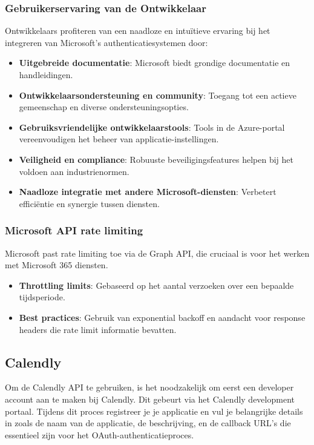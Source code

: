 \subsubsection{Gebruikerservaring van de Ontwikkelaar}
Ontwikkelaars profiteren van een naadloze en intuïtieve ervaring bij het integreren van Microsoft's authenticatiesystemen door:
\begin{itemize}
    \item \textbf{Uitgebreide documentatie}: Microsoft biedt grondige documentatie en handleidingen.
    \item \textbf{Ontwikkelaarsondersteuning en community}: Toegang tot een actieve gemeenschap en diverse ondersteuningsopties.
    \item \textbf{Gebruiksvriendelijke ontwikkelaarstools}: Tools in de Azure-portal vereenvoudigen het beheer van applicatie-instellingen.
    \item \textbf{Veiligheid en compliance}: Robuuste beveiligingsfeatures helpen bij het voldoen aan industrienormen.
    \item \textbf{Naadloze integratie met andere Microsoft-diensten}: Verbetert efficiëntie en synergie tussen diensten.
\end{itemize}

\subsubsection{Microsoft API rate limiting}

Microsoft past rate limiting toe via de Graph API, die cruciaal is voor het werken met Microsoft 365 diensten.
\begin{itemize}
    \item \textbf{Throttling limits}: Gebaseerd op het aantal verzoeken over een bepaalde tijdsperiode.
    \item \textbf{Best practices}: Gebruik van exponential backoff en aandacht voor response headers die rate limit informatie bevatten.
\end{itemize}



\newpage



\subsection{Calendly}
Om de Calendly API te gebruiken, is het noodzakelijk om eerst een developer account aan te maken bij Calendly. Dit gebeurt via het Calendly development portaal. Tijdens dit proces registreer je je applicatie en vul je belangrijke details in zoals de naam van de applicatie, de beschrijving, en de callback URL's die essentieel zijn voor het OAuth-authenticatieproces.

